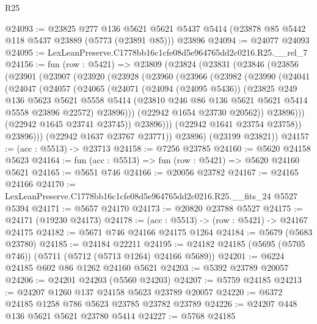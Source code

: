 \begin{lexlean}{R25}
\begin{coremodule}
@24093 := @23825
    @277
    @136
    @5621
    @5621
    @5437
    @5414
    (@23878 @85 @5442 @118 @5437 @23889 (@5773 (@23891 @85)))
    @23896
@24094 := @24077 @24093
@24095 := LexLeanPreserve.C1778bb16c1cfe08d5e964765dd2c0216.R25.__rel_7
@24156 := fun (row : @5421) =>
  @23809
    (@23824
      (@23831
        (@23846
          (@23856
            (@23901
              (@23907
                (@23920
                  (@23928
                    (@23960
                      (@23966
                        (@23982
                          (@23990
                            (@24041
                              (@24047
                                (@24057
                                  (@24065
                                    (@24071
                                      (@24094 (@24095 @5436))
                                      (@23825
                                        @249
                                        @136
                                        @5623
                                        @5621
                                        @5558
                                        @5414
                                        (@23810 @246 @86 @136 @5621 @5621 @5414 @5558 @23896 @22572)
                                        @23896)))
                                  (@22942 @1654 @23730 @20562))
                                @23896)))
                          (@22942 @1645 @23741 @23745))
                        @23896)))
                  (@22942 @1641 @23754 @23758))
                @23896)))
          (@22942 @1637 @23767 @23771))
        @23896)
      (@23199 @23821))
@24157 := (acc : @5513) -> @23713
@24158 := @7256 @23785
@24160 := @5620 @24158 @5623
@24164 := fun (acc : @5513) => fun (row : @5421) => @5620 @24160 @5621
@24165 := @5651 @746
@24166 := @20056 @23782
@24167 := @24165 @24166
@24170 := LexLeanPreserve.C1778bb16c1cfe08d5e964765dd2c0216.R25.__fits_24 @5527 @5394
@24171 := @5657 @24170
@24173 := @20820 @23788 @5527
@24175 := @24171 (@19230 @24173)
@24178 := (acc : @5513) -> (row : @5421) -> @24167 @24175
@24182 := @5671 @746 @24166 @24175 @1264
@24184 := @5679 (@5683 @23780)
@24185 := @24184 @22211
@24195 := @24182 @24185 (@5695 (@5705 @746)) (@5711 (@5712 (@5713 @1264) @24166 @5689))
@24201 := @6224 @24185 @602 @86 @1262 @24160 @5621
@24203 := @5392 @23789 @20057
@24206 := @24201 @24203 (@5560 @24203)
@24207 := @5759 @24185
@24213 := @24207 @1260 @137 @24158 @5623 @23789 @20057
@24220 := @6372 @24185 @1258 @786 @5623 @23785 @23782 @23789
@24226 := @24207 @448 @136 @5621 @5621 @23780 @5414
@24227 := @5768 @24185

\end{coremodule}
\end{lexlean}
